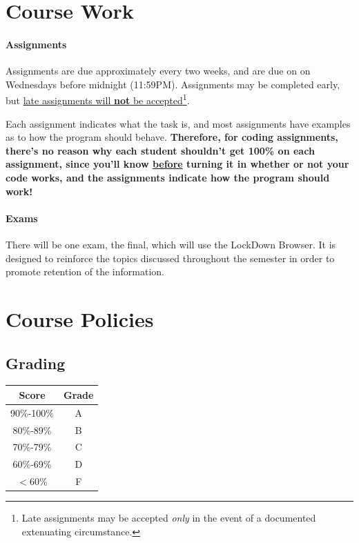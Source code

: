 \documentclass[letter,11pt]{article}
\begin{document}
\section*{Course Work}\label{sec:coursework}
\paragraph{Assignments} Assignments are due approximately every two weeks, and are due on on Wednesdays before midnight (11:59PM). Assignments may be completed early, but \underline{late assignments will \textbf{not} be accepted}\footnote{Late assignments may be accepted \textit{only} in the event of a documented extenuating circumstance.}.

Each assignment indicates what the task is, and most assignments have examples as to how the program should behave. \textbf{Therefore, for coding assignments, there's no reason why each student shouldn't get 100\% on each assignment, since you'll know \underline{before} turning it in whether or not your code works, and the assignments indicate how the program should work!}

\paragraph{Exams}There will be one exam, the final, which will use the LockDown Browser. It is designed to reinforce the topics discussed throughout the semester in order to promote retention of the information.

\section*{Course Policies}
\subsection*{Grading}

\begin{center}
\begin{tabular}{ c c} \\
\textbf{Score} & \textbf{Grade} \\
\hline
90\%-100\% & A \\
80\%-89\% & B \\
70\%-79\% & C \\ 
60\%-69\% & D \\
$<$60\%   & F 
\end{tabular}
\end{center}
\end{document}
